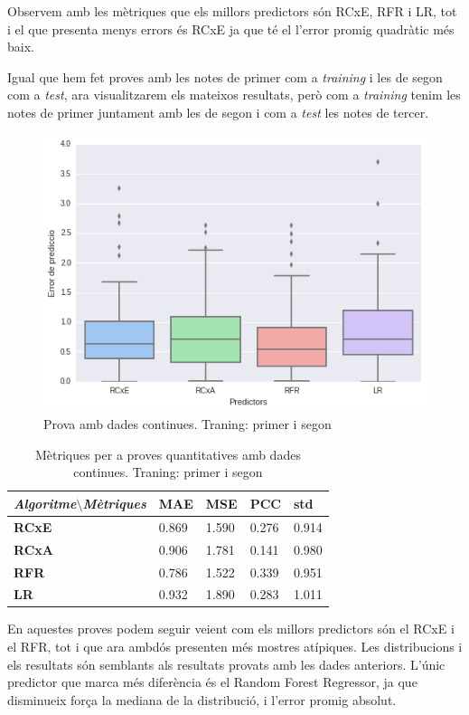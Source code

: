 \documentclass[12pt,a4paper,catalan]{article}
\begin{document}
Observem amb les mètriques que els millors predictors són RCxE, RFR i LR, tot i el que presenta menys errors és RCxE ja que té el l'error promig quadràtic més baix.

Igual que hem fet proves amb les notes de primer com a \textit{training} i les de segon com a \textit{test}, ara visualitzarem els mateixos resultats, però com a \textit{training} tenim les notes de primer juntament amb les de segon i com a \textit{test} les notes de tercer.

\begin{figure}[h]
\centering
\includegraphics[width=.7\linewidth]{img/boxplot_primersegon_tercer.png}
\caption{Prova amb dades continues. Traning: primer i segon}
\end{figure}

\begin{table}[h]
\centering
\begin{tabular}{lllll}
\hline
\textit{\textbf{Algoritme$\setminus$Mètriques}} & \textbf{MAE} & \textbf{MSE} & \textbf{PCC} & \textbf{std} \\ \hline
\textbf{RCxE}          & 0.869          & 1.590          & 0.276          & 0.914          \\
\textbf{RCxA}          & 0.906          & 1.781          & 0.141          & 0.980          \\
\textbf{RFR}           & 0.786          & 1.522          & 0.339          & 0.951          \\
\textbf{LR}            & 0.932          & 1.890          & 0.283          & 1.011          \\ \hline
\end{tabular}
\caption{Mètriques per a proves quantitatives amb dades continues. Traning: primer i segon}
\end{table}

En aquestes proves podem seguir veient com els millors predictors són el RCxE i el RFR, tot i que ara ambdós presenten més mostres atípiques. Les distribucions i els resultats són semblants als resultats provats amb les dades anteriors. L'únic predictor que marca més diferència és el Random Forest Regressor, ja que disminueix força  la mediana de la distribució, i l'error promig absolut.
\end{document}
